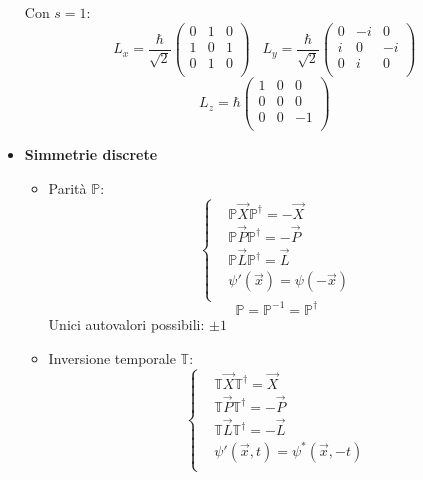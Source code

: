 \documentclass{article}
\DeclarePairedDelimiter\ket{\lvert}{\rangle}
\begin{document}
\begin{footnotesize}
\begin{multicols*}{3}
\begin{itemize}[leftmargin=*]
		Con $s=1$:
		\[L_x = \frac{\hbar }{\sqrt{2}}
			\begin{pmatrix}
				0&1&0\\
				1&0&1\\
				0&1&0\\
			\end{pmatrix}
			\hspace{10pt}
			L_y= \frac{\hbar }{\sqrt{2}}
			\begin{pmatrix}
				0&-i&0\\
				i&0&-i\\
				0&i&0\\
			\end{pmatrix}
			\]
		\[L_z = \hbar 
			\begin{pmatrix}
				1&0&0\\
				0&0&0\\
				0&0&-1\\
			\end{pmatrix}
		\]

	\item \textbf{Simmetrie discrete}
		\begin{itemize}
			\item Parità $\mathbb{P}$:
				\[
					\left\{\begin{aligned}
						&\mathbb{P}\vec{X}\mathbb{P}^\dag=-\vec{X}\\
						&\mathbb{P}\vec{P}\mathbb{P}^\dag=-\vec{P}\\
						&\mathbb{P}\vec{L}\mathbb{P}^\dag=\vec{L}\\
						&\psi '(\vec{x})= \psi (-\vec{x})\\
					\end{aligned}\right.
				\]
				\[\mathbb{P}=\mathbb{P}^{-1} = \mathbb{P}^\dag\]
				Unici autovalori possibili: $\pm1$
			\item Inversione temporale $\mathbb{T}$:
				\[
					\left\{\begin{aligned}
						&\mathbb{T}\vec{X}\mathbb{T}^\dag=\vec{X}\\
						&\mathbb{T}\vec{P}\mathbb{T}^\dag=-\vec{P}\\
						&\mathbb{T}\vec{L}\mathbb{T}^\dag=-\vec{L}\\
						&\psi '(\vec{x},t)= \psi^* (\vec{x},-t)\\
					\end{aligned}\right.
				\]


\end{itemize}
\end{itemize}
\end{multicols*}
\end{footnotesize}
\end{document}
